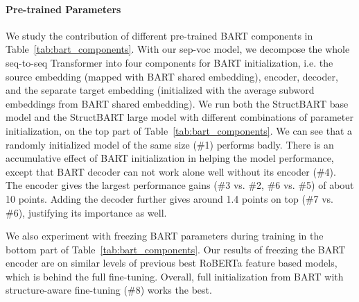 \paragraph{Pre-trained Parameters}

We study the contribution of different pre-trained BART components in Table~\ref{tab:bart_components}. With our sep-voc model, we decompose the whole seq-to-seq Transformer into four components for BART initialization, i.e. the source embedding (mapped with BART shared embedding), encoder, decoder, and the separate target embedding (initialized with the average subword embeddings from BART shared embedding). We run both the StructBART base model and the StructBART large model with different combinations of parameter initialization, on the top part of Table~\ref{tab:bart_components}.
We can see that a randomly initialized model of the same size (\#1) performs badly.
There is an accumulative effect of BART initialization in helping the model performance, except that BART decoder can not work alone well without its encoder (\#4).
The encoder gives the largest performance gains (\#3 vs. \#2, \#6 vs. \#5) of about 10 points.
Adding the decoder further gives around 1.4 points on top (\#7 vs. \#6), justifying its importance as well.

We also experiment with freezing BART parameters during training in the bottom part of Table~\ref{tab:bart_components}.
Our results of freezing the BART encoder are on similar levels of previous best RoBERTa feature based models, which is behind the full fine-tuning.
Overall, full initialization from BART with structure-aware fine-tuning (\#8) works the best.
